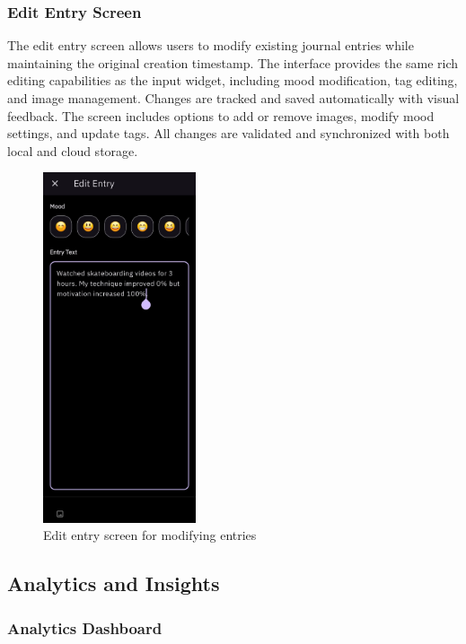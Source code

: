 \subsubsection{Edit Entry Screen}

The edit entry screen allows users to modify existing journal entries while maintaining the original creation timestamp. The interface provides the same rich editing capabilities as the input widget, including mood modification, tag editing, and image management. Changes are tracked and saved automatically with visual feedback. The screen includes options to add or remove images, modify mood settings, and update tags. All changes are validated and synchronized with both local and cloud storage.

\nopagebreak
\begin{figure}[H]
\centering
\includegraphics[width=0.4\textwidth]{files/imgs/prototype/edit_entry_screen.jpeg}
\caption{Edit entry screen for modifying entries}
\label{fig:edit-entry-screen}
\end{figure}

\subsection{Analytics and Insights}

\subsubsection{Analytics Dashboard}

